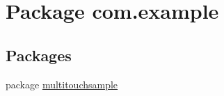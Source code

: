 \hypertarget{namespacecom_1_1example}{}\section{Package com.\+example}
\label{namespacecom_1_1example}
\subsection*{Packages}
\begin{DoxyCompactItemize}
\item 
package \hyperlink{namespacecom_1_1example_1_1multitouchsample}{multitouchsample}
\end{DoxyCompactItemize}
